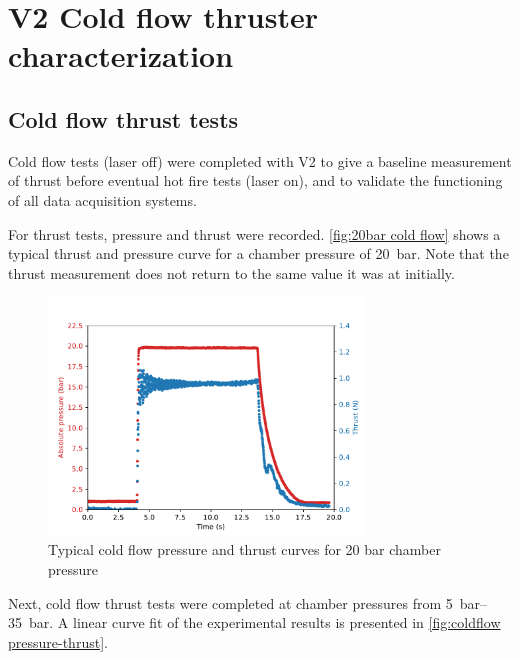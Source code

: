     \section{V2 Cold flow thruster characterization}

        \subsection{Cold flow thrust tests}

            Cold flow tests (laser off) were completed with V2 to give a baseline measurement of thrust before eventual hot fire tests (laser on), and to validate the functioning of all data acquisition systems. %

            For thrust tests, pressure and thrust were recorded. \autoref{fig:20bar cold flow} shows a typical thrust and pressure curve for a chamber pressure of \qty{20}{bar}. Note that the thrust measurement does not return to the same value it was at initially.

            \begin{figure}[!ht]
                \centering
                \includegraphics[width=0.75\textwidth]{assets/4 experiments/Example thrust 20 bar.pdf}
                \caption{Typical cold flow pressure and thrust curves for 20 bar chamber pressure}
                \label{fig:20bar cold flow}
            \end{figure}

            Next, cold flow thrust tests were completed at chamber pressures from \qtyrange{5}{35}{bar}. A linear curve fit of the experimental results is presented in \autoref{fig:coldflow pressure-thrust}.

